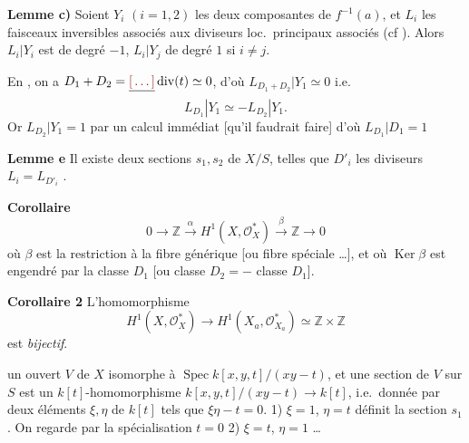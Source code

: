 \documentclass[11pt,a4paper]{article}
\begin{document}

\textbf{Lemme c)} \quad Soient $Y_i$ $(i = 1, 2)$ les deux composantes de $f^{-1}(a)$, et $L_i$ les faisceaux inversibles associés \struck{\ill{}} aux diviseurs loc.\ principaux associés (cf \ill{}). Alors $L_i | Y_i$ est de degré $-1$, $L_i | Y_j$ de degré $1$ si $i \neq j$.

En , on a $D_1 + D_2 = \struck{\ill{}}\operatorname{div}(t) \simeq 0$, d'où \struck{\ill{}} $L_{D_1 + D_2} | Y_1 \simeq 0$ i.e.
\[
  L_{D_1} | Y_1 \simeq - L_{D_2} | Y_1 .
\]
Or $L_{D_2} | Y_1 = 1$ par un calcul immédiat [qu'il faudrait  faire] d'où $L_{D_1} | D_1 = 1$

\textbf{Lemme e} \quad Il existe deux sections $s_1, s_2$ de $X/S$, telles que \struck{\ill{}} $D'_i$  les diviseurs  \ill{} $L_i = L_{D'_i}$ \ill{} .

\textbf{Corollaire}  \ill{} \ill{} \ill{}
\[
  0 \to \mathbb{Z} \xrightarrow{\ \alpha\ } H^1(X, \mathcal{O}^*_X) \xrightarrow{\ \beta\ } \mathbb{Z} \to 0
\]
où \struck{\ill{}} $\beta$ est \struck{\ill{}}  \ill{} la restriction à la fibre générique [ou \ill{} fibre spéciale  \ill{} …], et où $\operatorname{Ker} \beta$ est engendré par \struck{\ill{}} la classe $D_1$ [ou  classe $D_2 = -$ classe $D_1$].

\textbf{Corollaire 2} \quad L'homomorphisme 
\[
  H^1(X, \mathcal{O}^*_X) \to H^1(X_a, \mathcal{O}^*_{X_a}) \simeq \mathbb{Z} \times \mathbb{Z}
\]
est \emph{bijectif}.

 un ouvert  $V$ de $X$ isomorphe à $\operatorname{Spec} k[x, y, t]/(xy - t)$, et une section de $V$ sur $S$ est un $k[t]$-homomorphisme $k[x, y, t]/(xy - t) \to k[t]$, i.e.\ donnée par deux éléments $\xi, \eta$ de $k[t]$ tels que $\xi\eta - t = 0$.
1) $\xi = 1$, $\eta = t$ définit la section $s_1$. On regarde par la spécialisation $t = 0$ \ill{}
2) $\xi = t$, $\eta = 1$ …
\end{document}

